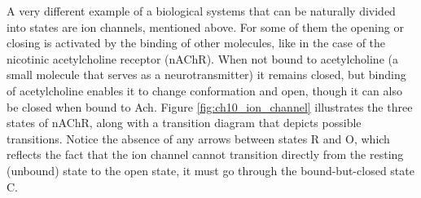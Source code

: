 \documentclass[
  letterpaper,
  DIV=11,
  numbers=noendperiod]{scrreprt}
\begin{document}
A very different example of a biological systems that can be naturally
divided into states are ion channels, mentioned above. For some of them
the opening or closing is activated by the binding of other molecules,
like in the case of the nicotinic acetylcholine receptor (nAChR). When
not bound to acetylcholine (a small molecule that serves as a
neurotransmitter) it remains closed, but binding of acetylcholine
enables it to change conformation and open, though it can also be closed
when bound to Ach. Figure \ref{fig:ch10_ion_channel} illustrates the
three states of nAChR, along with a transition diagram that depicts
possible transitions. Notice the absence of any arrows between states R
and O, which reflects the fact that the ion channel cannot transition
directly from the resting (unbound) state to the open state, it must go
through the bound-but-closed state C.
\end{document}

